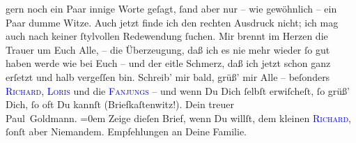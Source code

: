                gern noch ein Paar innige Worte geſagt, ſand aber nur – wie gewöhnlich – ein Paar
               dumme Witze. Auch jetzt finde ich den rechten Ausdruck nicht; ich mag auch nach
               keiner ſtylvollen Redewendung ſuchen. Mir brennt im Herzen die Trauer um Euch Alle, –
               die Überzeugung, daß ich es nie mehr wieder ſo gut haben werde wie bei Euch – und der
               eitle Schmerz, daß ich jetzt schon ganz erſetzt und halb vergeſſen bin.\pend
           \pstart
           Schreib’ mir bald, grüß’ mir Alle – beſonders \textsc{\textcolor{blue}{Richard}{}\ledrightnote{\textcolor{blue}{Richard Beer-Hofmann}}}, \textsc{\textcolor{blue}{Loris}{}\ledrightnote{\textcolor{blue}{Hugo von Hofmannsthal}}} und die \textsc{\textcolor{blue}{Fanjungs}{}} – und wenn Du Dich {\pb}ſelbſt erwiſcheſt, ſo
               grüß’ Dich, ſo oft Du kannſt (Briefkaſtenwitz!).\pend
           \pstart
           Dein treuer {\\[\baselineskip]}\spacefill\mbox{Paul Goldmann.}\pend
           \leftskip=0em{}\pstart
           \noindent{}Zeige dieſen Brief, wenn Du willſt, dem kleinen \textsc{\textcolor{blue}{Richard}{}\ledrightnote{\textcolor{blue}{Richard Beer-Hofmann}}}, ſonſt aber Niemandem.\pend
           \pstart
           Empfehlungen an Deine Familie.\pend
           \endnumbering{}  
      